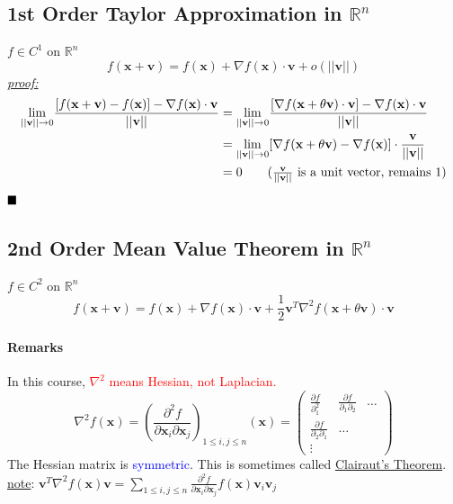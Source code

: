 \documentclass[11pt]{article}
\newcommand{\tb}[1]{\textbf{#1}}
\newcommand{\real}[0]{\mathbb{R}}
\newcommand{\under}[1]{\underline{#1}}
\newcommand{\proof}[0]{\textit{\underline{proof:} }}
\newcommand{\vx}[0]{\tb{x}}
\newcommand{\vv}[0]{\tb{v}}
\newcommand{\qed}[0]{$\hfill\blacksquare$}
\begin{document}
\subsection{1st Order Taylor Approximation in $\real^n$}
$f \in C^1$ on $\real^n$
$$f(\vx + \vv) = f(\vx) + \nabla f(\vx) \cdot \vv + o(||\vv||)$$
\proof \\
\begin{align*}
	\underset{||\vv|| \rightarrow 0}{\lim} \frac{[f(\vx + \vv) - f(\vx)] - \nabla f(\vx) \cdot \vv }{||\vv||} 
	&= \underset{||\vv|| \rightarrow 0}{\lim} \frac{[\nabla f(\vx + \theta \vv) \cdot \vv] - \nabla f(\vx) \cdot \vv}{||\vv||} \\
	&= \underset{||\vv|| \rightarrow 0}{\lim} [\nabla f(\vx + \theta \vv) - \nabla f(\vx)] \cdot \frac{\vv}{||\vv||} \\
	&= 0 \tag{$\frac{\vv}{||\vv||}$ is a unit vector, remains 1}
\end{align*}
\qed
\subsection{2nd Order Mean Value Theorem in $\real^n$}
$f \in C^2$ on $\real ^n$
$$ f(\vx + \vv) = f(\vx) + \nabla f(\vx) \cdot \vv + \frac{1}{2}\vv^T\nabla^2 f(\vx + \theta \vv) \cdot \vv$$
\paragraph{Remarks}
In this course, \textcolor{red}{$\nabla^2$ means Hessian, not Laplacian.}
$$\nabla^2 f(\vx) =  \left( \frac{\partial^2 f}{\partial \vx_i \partial \vx_j}\right)_{1\leq i, j\leq n}(\vx) = \begin{pmatrix}
	\frac{\partial f}{\partial_1^2} & \frac{\partial f}{\partial_1 \partial_2} & \hdots \\
	\frac{\partial f}{\partial_2 \partial_1} & \hdots \\
	\vdots
\end{pmatrix}$$
The Hessian matrix is \textcolor{blue}{symmetric}. This is sometimes called \under{Clairaut's Theorem}.\\
\under{note}: $\vv^T \nabla^2 f(\vx)\vv = \sum_{1 \leq i, j\leq n} \frac{\partial^2 f}{\partial \vx_i \partial \vx_j}f(\vx)\vv_i \vv_j$
\end{document}
